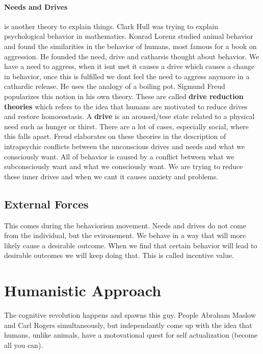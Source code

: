 \documentclass[12pt]{article}
\begin{document}
\paragraph*{Needs and Drives} is another theory to explain things. Clark Hull was trying to explain psychological behavior in mathematics. Konrad Lorenz studied animal behavior and found the similarities in the behavior of humans, most famous for a book on aggression. He founded the need, drive and catharsis thought about behavior. We have a need to aggress, when it isnt met it causes a drive which causes a change in behavior, once this is fulfilled we dont feel the need to aggress anymore in a cathardic release. He uses the analogy of a boiling pot. Sigmund Freud popularizes this notion in his own theory. These are called \textbf{drive reduction theories} which refers to the idea that humans are motivated to reduce drives and restore homoeostasis. A \textbf{drive} is an aroused/tese state related to a physical need such as hunger or thirst. There are a lot of cases, especially social, where this falls apart. Freud elaborates on these theories in the description of intrapsychic conflicts between the unconscious drives and needs and what we consciously want. All of behavior is caused by a conflict between what we subconsciously want and what we consciously want. We are trying to reduce these inner drives and when we cant it causes anxiety and problems. 

\subsection*{External Forces}
This comes during the behaviorism movement. Needs and drives do not come from the individual, but the evironement. We behave in a way that will more likely cause a desirable outcome. When we find that certain behavior will lead to desirable outcomes we will keep doing that. This is called incentive value. 

\section*{Humanistic Approach}
The cognitive revolution happens and spawns this guy. People Abraham Maslow and Carl Rogers simultaneously, but independantly come up with the idea that humans, unlike animals, have a motovational quest for self actualization (become all you can).
\end{document}
